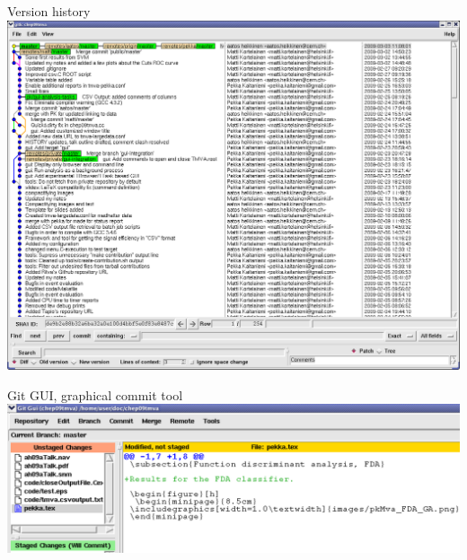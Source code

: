 \documentclass[final,hyperref={pdfpagelabels=false},notitlepage=true]{beamer}
\begin{document}
\begin{frame}{}
\begin{columns}[t]
\begin{column}{0.45\linewidth}
    \begin{block}{\large Version history}
      \includegraphics[scale=1.0]{images/gitk-history.png}
    \end{block}

    \begin{block}{\large Git GUI, graphical commit tool}
      \includegraphics[scale=1.0]{images/gui-screenshot-detail.png}
    \end{block}


\end{column}
\end{columns}
\end{frame}
\end{document}
